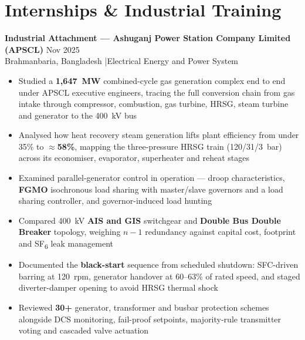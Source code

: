 %
%
%

\section{Internships \& Industrial Training}

\textbf{Industrial Attachment --- Ashuganj Power Station Company Limited (APSCL)} \hfill Nov 2025\\
Brahmanbaria, Bangladesh \quad|\quad Electrical Energy and Power System
\begin{itemize}
  \item Studied a \textbf{1,647~MW} combined-cycle gas generation complex end to end under APSCL executive engineers, tracing the full conversion chain from gas intake through compressor, combustion, gas turbine, HRSG, steam turbine and generator to the 400~kV bus
  \item Analysed how heat recovery steam generation lifts plant efficiency from under 35\% to \textbf{$\approx$58\%}, mapping the three-pressure HRSG train (120/31/3~bar) across its economiser, evaporator, superheater and reheat stages
  \item Examined parallel-generator control in operation --- droop characteristics, \textbf{FGMO} isochronous load sharing with master/slave governors and a load sharing controller, and governor-induced load hunting
  \item Compared 400~kV \textbf{AIS and GIS} switchgear and \textbf{Double Bus Double Breaker} topology, weighing $n{-}1$ redundancy against capital cost, footprint and SF\textsubscript{6} leak management
  \item Documented the \textbf{black-start} sequence from scheduled shutdown: SFC-driven barring at 120~rpm, generator handover at 60--63\% of rated speed, and staged diverter-damper opening to avoid HRSG thermal shock
  \item Reviewed \textbf{30+} generator, transformer and busbar protection schemes alongside DCS monitoring, fail-proof setpoints, majority-rule transmitter voting and cascaded valve actuation
\end{itemize}

